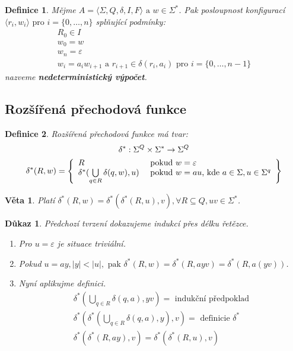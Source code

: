 \documentclass[10pt, a4paper, titlepage]{article}
\theoremstyle{note}
\newtheorem{veta}{\textbf{Věta}}
\newtheorem{definice}{\textbf{Definice}}
\newtheorem{dukaz}{\textbf{Důkaz}}
\begin{document}
\begin{definice}
Mějme $A = \langle \Sigma, Q, \delta, I, F \rangle  \text{ a } w \in \Sigma^{*}$. Pak posloupnost konfigurací $\langle r_{i}, w_{i} \rangle \text{ pro } i = \lbrace 0, \ldots, n \rbrace $ splňující podmínky:
\begin{gather}
R_{0} \in I \\
w_{0} = w \\
w_{n} = \varepsilon \\
w_{i} = a_{i}w_{i+1} \text{ a } r_{i+1} \in \delta (r_{i}, a_{i}) \text{ pro } i = \lbrace 0, \ldots,  n-1 \rbrace
\end{gather}
nazveme \textbf{nedeterministický výpočet}.
\end{definice}

\subsection{Rozšířená přechodová funkce}
\begin{definice}
Rozšířená přechodová funkce má tvar:
\begin{gather*}
\delta^{*} : \Sigma^{Q} \times \Sigma^{*} \rightarrow \Sigma^{Q} \\
\delta^{*}(R, w) = \left\lbrace
\begin{array}{l l}
R & \text{ pokud } w = \varepsilon \\
\delta^{*}(\bigcup\limits_{q \in R} \delta(q, w), u) & \text{ pokud } w = au\text{, kde } a \in \Sigma, u \in \Sigma^{q} \\
\end{array}
\right\rbrace
\end{gather*}
\end{definice}

\begin{veta}
Platí $\delta^{*}(R,w) = \delta^{*}(\delta^{*}(R,u),v), \forall R \subseteq Q, uv \in \Sigma^{*}$.
\end{veta}
\begin{dukaz}
Předchozí tvrzení dokazujeme indukcí přes délku řetězce.

\begin{enumerate}
\item
Pro $u = \varepsilon$ je situace triviální.

\item
Pokud $u = ay, |y| < |u|,\text{ pak } \delta^{*}(R,w) = \delta^{*}(R,ayv) = \delta^{*}(R,a(yv))$.

\item
Nyní aplikujme definici.
\begin{gather*}
\delta^{*}(\bigcup\limits_{q \in R} \delta(q, a), yv) = \text{ indukční předpoklad} \\
\delta^{*}(\delta^{*}(\bigcup\limits_{q \in R} \delta(q, a), y), v) = \text{ definicie } \delta^{*} \\
\delta^{*}(\delta^{*}(R, ay), v) = \delta^{*}(\delta^{*}(R,u),v)
\end{gather*}
\end{enumerate}
\end{dukaz}
\end{document}
